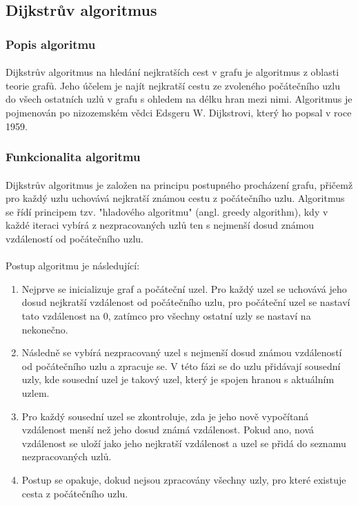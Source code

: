 \documentclass[12pt]{article}
\begin{document}
\subsection{Dijkstrův algoritmus}
\subsubsection{Popis algoritmu}
\paragraph{}
Dijkstrův algoritmus na hledání nejkratších cest v grafu je algoritmus z oblasti teorie 
grafů. Jeho účelem je najít nejkratší cestu ze zvoleného počátečního uzlu do všech ostatních 
uzlů v grafu s ohledem na délku hran mezi nimi. Algoritmus je pojmenován po nizozemském vědci 
Edsgeru W. Dijkstrovi, který ho popsal v roce 1959.
\subsubsection{Funkcionalita algoritmu}
\paragraph{}
Dijkstrův algoritmus je založen na principu postupného procházení grafu, přičemž pro každý 
uzlu uchovává nejkratší známou cestu z počátečního uzlu. Algoritmus se řídí principem tzv. 
"hladového algoritmu" (angl. greedy algorithm), kdy v každé iteraci vybírá z nezpracovaných 
uzlů ten s nejmenší dosud známou vzdáleností od počátečního uzlu.
\paragraph{}
Postup algoritmu je následující:
\begin{enumerate}
    \item Nejprve se inicializuje graf a počáteční uzel. Pro každý uzel se uchovává jeho 
    dosud nejkratší vzdálenost od počátečního uzlu, pro počáteční uzel se nastaví tato 
    vzdálenost na 0, zatímco pro všechny ostatní uzly se nastaví na nekonečno.

    \item Následně se vybírá nezpracovaný uzel s nejmenší dosud známou vzdáleností od 
    počátečního uzlu a zpracuje se. V této fázi se do uzlu přidávají sousední uzly, kde 
    sousední uzel je takový uzel, který je spojen hranou s aktuálním uzlem.
    
    \item Pro každý sousední uzel se zkontroluje, zda je jeho nově vypočítaná vzdálenost 
    menší než jeho dosud známá vzdálenost. Pokud ano, nová vzdálenost se uloží jako jeho 
    nejkratší vzdálenost a uzel se přidá do seznamu nezpracovaných uzlů.
    
    \item Postup se opakuje, dokud nejsou zpracovány všechny uzly, pro které existuje 
    cesta z počátečního uzlu.
\end{enumerate}
\end{document}
